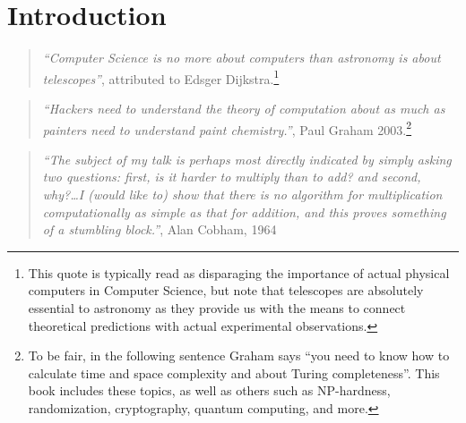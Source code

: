 \chapter{Introduction}\label{chapintro}


\begin{quote}
\emph{``Computer Science is no more about computers than astronomy is
about telescopes''}, attributed to Edsger Dijkstra.\footnote{This quote
  is typically read as disparaging the importance of actual physical
  computers in Computer Science, but note that telescopes are absolutely
  essential to astronomy as they provide us with the means to connect
  theoretical predictions with actual experimental observations.}
\end{quote}

\begin{quote}
\emph{``Hackers need to understand the theory of computation about as
much as painters need to understand paint chemistry.''}, Paul Graham
2003.\footnote{To be fair, in the following sentence Graham says ``you
  need to know how to calculate time and space complexity and about
  Turing completeness''. This book includes these topics, as well as
  others such as NP-hardness, randomization, cryptography, quantum
  computing, and more.}
\end{quote}

\begin{quote}
\emph{``The subject of my talk is perhaps most directly indicated by
simply asking two questions: first, is it harder to multiply than to
add? and second, why?\ldots I (would like to) show that there is no
algorithm for multiplication computationally as simple as that for
addition, and this proves something of a stumbling block.''}, Alan
Cobham, 1964
\end{quote}

